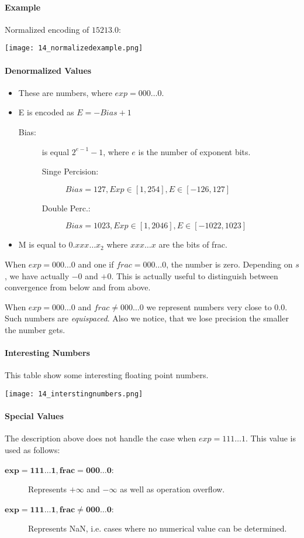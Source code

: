\paragraph{Example}
Normalized encoding of $15213.0$:

\texttt{[image: 14\_normalizedexample.png]}

\paragraph{Denormalized Values}
\begin{itemize}
    \item These are numbers, where $exp = 000 \dots 0$.
    \item E is encoded as $E= -Bias + 1$
        \begin{description}
            \item[Bias:] is equal $2^{e-1} - 1$, where $e$ is the number of exponent bits.
                \begin{description}
                    \item[Singe Percision:] $Bias = 127, Exp \in [1, 254], E \in [-126, 127]$
                    \item[Double Perc.:] $Bias = 1023, Exp \in [1, 2046], E \in [-1022, 1023]$
                \end{description}
        \end{description}
    \item M is equal to $0.xxx \dots x_2$ where $xxx \dots x$ are the bits of frac.
\end{itemize}

When $exp = 000 \dots 0$ and one if $frac = 000 \dots 0$, the number is zero. Depending on $s$, we have actually $-0$ and $+0$. This is actually useful to distinguish between convergence from below and from above.

When $exp = 000 \dots 0$ and $frac \neq 000 \dots 0$ we represent numbers very close to $0.0$. Such numbers are \textit{equispaced}. Also we notice, that we lose precision the smaller the number gets.

\paragraph{Interesting Numbers}
This table show some interesting floating point numbers.

\texttt{[image: 14\_interstingnumbers.png]}

\paragraph{Special Values}
The description above does not handle the case when $exp = 111 \dots 1$. This value is used as follows:
\begin{description}
    \item[$\mathbf{exp = 111 \dots 1, frac = 000 \dots 0}$:] Represents $+\infty$ and $-\infty$ as well as operation overflow.
        \item[$\mathbf{exp = 111 \dots 1, frac \neq 000 \dots 0}$:] Represents NaN, i.e. cases where no numerical value can be determined.
\end{description}

